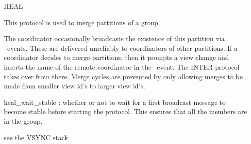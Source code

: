 %
%
%
\begin{Layer}{HEAL}

This protocol is used to merge partitions of a group.

\begin{Protocol}
The coordinator occasionally broadcasts the existence of this partition via
\DnGossipExt\ events.  These are delivered unreliably to coordinators of other
partitions.  If a coordinator decides to merge partitions, then it prompts a
view change and inserts the name of the remote coordinator in the \UpBlockOk\
event.  The INTER protocol takes over from there.  Merge cycles are prevented
by only allowing merges to be made from smaller view id's to larger view id's.
\end{Protocol}

\begin{Parameters}
\item
heal\_wait\_stable : whether or not to wait for a first broadcast message to
become stable before starting the protocol.  This ensures that all the members
are in the group.
\end{Parameters}

\begin{Properties}
\item \todo{}
\end{Properties}

\begin{Sources}
\end{Sources}

\begin{GenEvent}
\genevent{\UpPrompt}
\genevent{\DnGossipExt}
\end{GenEvent}

\begin{Testing}
\item see the VSYNC stack
\end{Testing}
\end{Layer}
